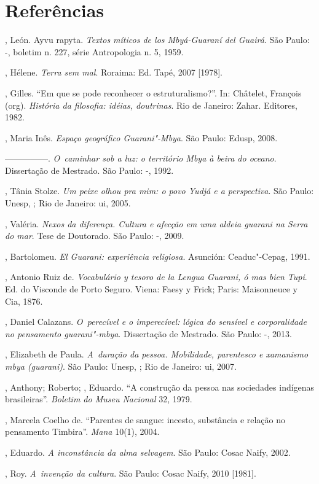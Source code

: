 \section{Referências}

\begin{Parskip}
, León. Ayvu rapyta. \emph{Textos míticos de los Mbyá-Guaraní del
Guairá}. São Paulo: -, boletim n. 227, série Antropologia n. 5,
1959.

, Hélene. \emph{Terra sem mal}. Roraima: Ed. Tapé, 2007 [1978].

, Gilles. ``Em que se pode reconhecer o estruturalismo?''.
In: Châtelet, François (org). \emph{História da filosofia: idéias,
doutrinas}. Rio de Janeiro: Zahar. Editores, 1982.

, Maria Inês. \emph{Espaço geográfico Guarani"-Mbya}. São Paulo:
Edusp, 2008.

—————. \emph{O~caminhar sob a luz: o território Mbya à beira do oceano}. 
Dissertação de Mestrado. São Paulo: -, 1992.

, Tânia Stolze. \emph{Um peixe olhou pra mim: o povo Yudjá e a
perspectiva}. São Paulo: Unesp, ; Rio de Janeiro: ui, 2005.

, Valéria. \emph{Nexos da diferença. Cultura e afecção em uma
aldeia guarani na Serra do mar}. Tese de Doutorado. São Paulo:
-, 2009.

, Bartolomeu. \emph{El Guarani: experiência religiosa}. Asunción:
Ceaduc"-Cepag, 1991.

, Antonio Ruiz de. \emph{Vocabulário y tesoro de la Lengua
Guarani, ó mas bien Tupi}. Ed. do Visconde de Porto Seguro. Viena: Faesy
y Frick; Paris: Maisonneuce y Cia, 1876.

, Daniel Calazans. \emph{O~perecível e o imperecível: lógica do
sensível e corporalidade no pensamento guarani"-mbya}. Dissertação de
Mestrado. São Paulo: -, 2013.

, Elizabeth de Paula. \emph{A~duração da pessoa. Mobilidade,
parentesco e xamanismo mbya (guarani)}. São Paulo: Unesp, ; Rio de
Janeiro: ui, 2007.

, Anthony;  Roberto; , Eduardo. ``A
construção da pessoa nas sociedades indígenas brasileiras''. \emph{Boletim do
Museu Nacional} 32, 1979. 

, Marcela Coelho de. ``Parentes de sangue: incesto, substância
e relação no pensamento Timbira''. \emph{Mana} 10(1), 2004.

, Eduardo. \emph{A inconstância da alma selvagem}. São
Paulo: Cosac Naify, 2002.

, Roy. \emph{A~invenção da cultura}. São Paulo: Cosac Naify, 2010
[1981].
\end{Parskip}

